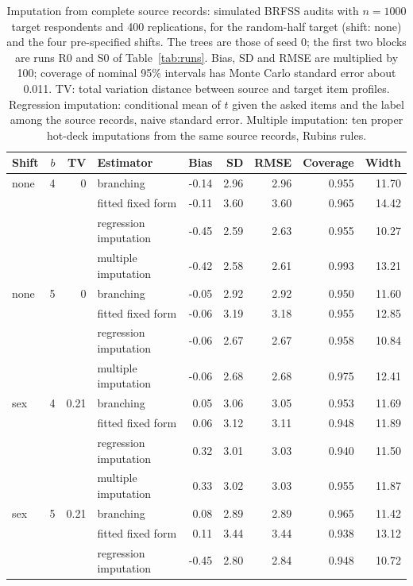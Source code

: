\begin{table}[h]
\centering
\caption{Imputation from complete source records: simulated BRFSS audits with $n=1000$ target respondents and 400 replications, for the random-half target (shift: none) and the four pre-specified shifts. The trees are those of seed 0; the first two blocks are runs R0 and S0 of Table~\ref{tab:runs}. Bias, SD and RMSE are multiplied by 100; coverage of nominal 95\% intervals has Monte Carlo standard error about 0.011. TV: total variation distance between source and target item profiles. Regression imputation: conditional mean of $t$ given the asked items and the label among the source records, naive standard error. Multiple imputation: ten proper hot-deck imputations from the same source records, Rubin\textquotesingle s rules.}
\label{tab:shift}
\scriptsize
\setlength{\tabcolsep}{2.6pt}
\begin{tabular}{lrrlrrrrr}
\toprule
Shift & $b$ & TV & Estimator & Bias & SD & RMSE & Coverage & Width \\
\midrule
none & 4 & 0 & branching & -0.14 & 2.96 & 2.96 & 0.955 & 11.70 \\
 &  &  & fitted fixed form & -0.11 & 3.60 & 3.60 & 0.965 & 14.42 \\
 &  &  & regression imputation & -0.45 & 2.59 & 2.63 & 0.955 & 10.27 \\
 &  &  & multiple imputation & -0.42 & 2.58 & 2.61 & 0.993 & 13.21 \\
none & 5 & 0 & branching & -0.05 & 2.92 & 2.92 & 0.950 & 11.60 \\
 &  &  & fitted fixed form & -0.06 & 3.19 & 3.18 & 0.955 & 12.85 \\
 &  &  & regression imputation & -0.06 & 2.67 & 2.67 & 0.958 & 10.84 \\
 &  &  & multiple imputation & -0.06 & 2.68 & 2.68 & 0.975 & 12.41 \\
sex & 4 & 0.21 & branching & 0.05 & 3.06 & 3.05 & 0.953 & 11.69 \\
 &  &  & fitted fixed form & 0.06 & 3.12 & 3.11 & 0.948 & 11.89 \\
 &  &  & regression imputation & 0.32 & 3.01 & 3.03 & 0.940 & 11.50 \\
 &  &  & multiple imputation & 0.33 & 3.02 & 3.03 & 0.955 & 11.87 \\
sex & 5 & 0.21 & branching & 0.08 & 2.89 & 2.89 & 0.965 & 11.42 \\
 &  &  & fitted fixed form & 0.11 & 3.44 & 3.44 & 0.938 & 13.12 \\
 &  &  & regression imputation & -0.45 & 2.80 & 2.84 & 0.948 & 10.72 \\

\end{tabular}
\end{table}
